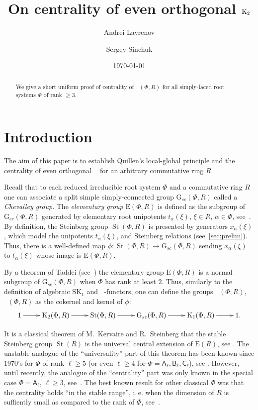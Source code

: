 \documentclass[11pt]{amsart}
\title{On centrality of even orthogonal $\Kt$}
\author {Andrei Lavrenov}
\author{Sergey Sinchuk}
\date {\today}
\theoremstyle{plain} \declaretheorem[name=Theorem, Refname={Theorem,Theorems}]{tm} \Crefname{tm}{Theorem}{Theorems}
\numberwithin{equation}{section}
\theoremstyle{definition} \newtheorem{df}[lm]{Definition} \Crefname{df}{Definition}{Definitions}
\theoremstyle{remark} \newtheorem{rk}[lm]{Remark} \Crefname{rk}{Remark}{Remarks}
\newcommand{\E}{{\mathrm{E}}}
\newcommand{\GG}{{\mathrm{G}_{sc}}}
\newcommand{\St}{\mathop{\mathrm{St}}\nolimits}
\newcommand{\Kt}{\mathop{\mathrm{K_2}}\nolimits}
\newcommand{\Ko}{\mathop{\mathrm{K_1}}\nolimits}
\newcommand{\rA}{\mathsf{A}}
\newcommand{\rB}{\mathsf{B}}
\newcommand{\rC}{\mathsf{C}}
\begin{document}
\begin{abstract} We give a short uniform proof of centrality of $\Kt(\Phi, R)$ for all simply-laced root systems $\Phi$ of rank $\geq 3$.
\end{abstract}

\maketitle

\section*{Introduction}
The aim of this paper is to establish Quillen's local-global principle and the centrality of even orthogonal $\Kt$ for an arbitrary commutative ring $R$.

Recall that to each reduced irreducible root system $\Phi$ and a commutative ring $R$ one can associate a split simple simply-connected group $\GG(\Phi, R)$ called a \emph{Chevalley group}.
The {\it elementary group} $\E(\Phi, R)$ is defined as the subgroup of $\GG(\Phi, R)$ generated by elementary root unipotents $t_\alpha(\xi)$, $\xi\in R$, $\alpha\in \Phi$, see~\cite{Ta, St78}.
By definition, the Steinberg group $\St(\Phi, R)$ is presented by generators $x_\alpha(\xi)$, which model the unipotents $t_\alpha(\xi)$, and Steinberg relations (see~\cref{sec:prelim}). 
Thus, there is a well-defined map $\phi\colon\St(\Phi, R)\to \GG(\Phi, R)$ sending $x_\alpha(\xi)$ to $t_\alpha(\xi)$ whose image is $\E(\Phi, R)$.

By a theorem of Taddei (see~\cite{Ta}) the elementary group $\E(\Phi, R)$ is a normal subgroup of $\GG(\Phi, R)$ when $\Phi$ has rank at least $2$.
Thus, similarly to the definition of algebraic $\mathrm{SK}_1$ and $\Kt$-functors, one can define the groups $\Ko(\Phi, R)$, $\Kt(\Phi, R)$ as the cokernel and kernel of $\phi$:
$$\xymatrix{1 \ar[r] & \Kt(\Phi, R) \ar[r] & \St(\Phi, R) \ar[r] & \GG(\Phi, R) \ar[r] & \Ko(\Phi, R) \ar[r] & 1.}$$

It is a classical theorem of M.~Kervaire and R.~Steinberg that the stable Steinberg group $\St(R)$ is the universal central extension of $\E(R)$, see \cite[Theorem~III.5.5]{Kbook}.
The unstable analogue of the ``universality'' part of this theorem has been known since 1970's for $\Phi$ of rank $\ell \geq 5$ (or even $\ell \geq 4$ for $\Phi=\rA_\ell, \rB_\ell, \rC_\ell$), see \cite{St1, KaS}.
However, until recently, the analogue of the ``centrality'' part was only known in the special case $\Phi=\rA_\ell$, $\ell\geq 3$, see~\cite[Corollary~2]{vdK}.
The best known result for other classical $\Phi$ was that the centrality holds ``in the stable range'',
i.\,e. when the dimension of $R$ is suffiently small as compared to the rank of $\Phi$, see~\cite[Corollary~3.4]{St78}.
\end{document}

